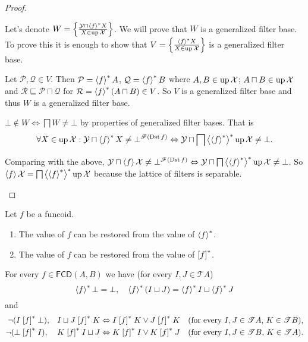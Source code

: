 \begin{proof}
\begin{widedisorder}
Let's denote $W=\left\{ \frac{\mathcal{Y}\sqcap\left\langle f\right\rangle ^{\ast}X}{X\in\operatorname{up}\mathcal{X}}\right\}$.
We will prove that $W$ is a generalized filter base. To prove this
it is enough to show that $V=\left\{ \frac{\left\langle f\right\rangle ^{\ast}X}{X\in\operatorname{up}\mathcal{X}}\right\}$
is a generalized filter base.


Let $\mathcal{P},\mathcal{Q}\in V$. Then $\mathcal{P}=\left\langle f\right\rangle ^{\ast}A$,
$\mathcal{Q}=\left\langle f\right\rangle ^{\ast}B$ where $A,B\in\operatorname{up}\mathcal{X}$; $A\sqcap
B\in\operatorname{up}\mathcal{X}$
and $\mathcal{R}\sqsubseteq\mathcal{P}\sqcap\mathcal{Q}$ for
$\mathcal{R}=\left\langle f\right\rangle ^{\ast}(A\sqcap B)\in V$.
So $V$ is a generalized filter base and thus $W$ is a generalized
filter base.


$\bot\notin W\Leftrightarrow\bigsqcap
W\ne\bot$
by properties of generalized filter bases. That is
\[
\forall X\in\operatorname{up}\mathcal{X}:\mathcal{Y}\sqcap\left\langle f\right\rangle ^{\ast}X\neq\bot^{\mathscr{F}(\operatorname{Dst}
f)}\Leftrightarrow\mathcal{Y}\sqcap\bigsqcap\left\langle \left\langle f\right\rangle ^{\ast}\right\rangle ^{\ast}\operatorname{up}\mathcal{X}\ne\bot.
\]



Comparing with the above, $\mathcal{Y}\sqcap\left\langle f\right\rangle\mathcal{X}\ne\bot^{\mathscr{F}(\operatorname{Dst}
f)}\Leftrightarrow\mathcal{Y}\sqcap\bigsqcap\left\langle \left\langle f\right\rangle ^{\ast}\right\rangle ^{\ast}\operatorname{up}\mathcal{X}\ne\bot$.
So $\left\langle f\right\rangle\mathcal{X}=\bigsqcap\left\langle \left\langle f\right\rangle ^{\ast}\right\rangle ^{\ast}\operatorname{up}\mathcal{X}$
because the lattice of filters is separable.

\end{widedisorder}
\end{proof}
\begin{cor}
Let $f$ be a funcoid.
\begin{enumerate}
\item The value of $f$ can be restored from the value of $\left\langle f\right\rangle ^{\ast}$.
\item The value of $f$ can be restored from the value of $\mathrel{\left[f\right]^{\ast}}$.
\end{enumerate}
\end{cor}
\begin{prop}
For every $f\in\mathsf{FCD}(A,B)$ we have (for every $I,J\in\mathscr{T}A$)
\[
\left\langle f\right\rangle ^{\ast}\bot=\bot,\quad\left\langle f\right\rangle ^{\ast}(I\sqcup
J)=\left\langle f\right\rangle ^{\ast}I\sqcup\left\langle f\right\rangle ^{\ast}J
\]
and
\begin{align*}
\lnot(I & \mathrel{\left[f\right]^{\ast}}\bot), & I\sqcup J\mathrel{\left[f\right]^{\ast}}K &
\Leftrightarrow I\mathrel{\left[f\right]^{\ast}}K\lor J\mathrel{\left[f\right]^{\ast}}K & \text{(for every
\ensuremath{I,J\in\mathscr{T}A}, \ensuremath{K\in\mathscr{T}B})},\\
\lnot(\bot & \mathrel{\left[f\right]^{\ast}}I), & K\mathrel{\left[f\right]^{\ast}}I\sqcup J &
\Leftrightarrow K\mathrel{\left[f\right]^{\ast}}I\lor K\mathrel{\left[f\right]^{\ast}}J & \text{(for every
\ensuremath{I,J\in\mathscr{T}B}, \ensuremath{K\in\mathscr{T}A})}.
\end{align*}
\end{prop}
